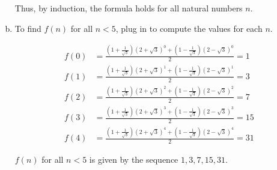 \documentclass[12pt]{article}
\begin{document}
\begin{enumerate}[(a)]
    Thus, by induction, the formula holds for all natural numbers \( n \).
    \item 
    To find \( f(n) \) for all \( n < 5 \), plug in to compute the values for each \( n \).

\[
\begin{aligned}
f(0) &= \frac{{(1 + \frac{1}{\sqrt{3}})(2 + \sqrt{3})^0 + (1 - \frac{1}{\sqrt{3}})(2 - \sqrt{3})^0}}{2} = 1 \\
f(1) &= \frac{{(1 + \frac{1}{\sqrt{3}})(2 + \sqrt{3})^1 + (1 - \frac{1}{\sqrt{3}})(2 - \sqrt{3})^1}}{2} = 3 \\
f(2) &= \frac{{(1 + \frac{1}{\sqrt{3}})(2 + \sqrt{3})^2 + (1 - \frac{1}{\sqrt{3}})(2 - \sqrt{3})^2}}{2} = 7 \\
f(3) &= \frac{{(1 + \frac{1}{\sqrt{3}})(2 + \sqrt{3})^3 + (1 - \frac{1}{\sqrt{3}})(2 - \sqrt{3})^3}}{2} = 15 \\
f(4) &= \frac{{(1 + \frac{1}{\sqrt{3}})(2 + \sqrt{3})^4 + (1 - \frac{1}{\sqrt{3}})(2 - \sqrt{3})^4}}{2} = 31
\end{aligned}
\]

\( f(n) \) for all \( n < 5 \) is given by the sequence \( 1, 3, 7, 15, 31 \).

\end{enumerate}
\end{document}
